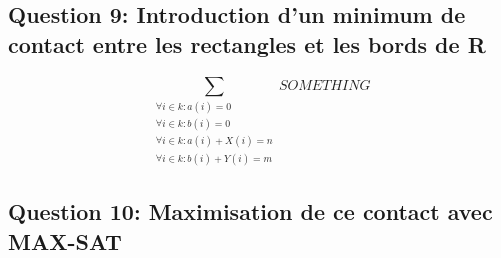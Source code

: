 \documentclass[a4paper,10pt]{article}
\begin{document}
\subsection{Question 9: Introduction d'un minimum de contact entre les rectangles et les bords de R}

$$ \sum_{\substack{\forall i \in k : a(i) = 0\\
                \forall i \in k : b(i) = 0\\
                \forall i \in k : a(i)+ X(i) = n\\
                \forall i \in k : b(i)+ Y(i) = m }}
SOMETHING $$

\subsection{Question 10: Maximisation de ce contact avec MAX-SAT}
\end{document}
